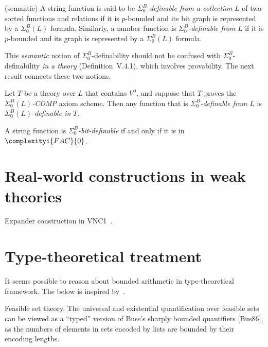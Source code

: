\begin{definition}[V.4.12] (semantic)
A string function is said to be \(\Sigma^B_0\)\textit{-definable from a collection} \(L\) of two-sorted functions and relations if it is \(p\)-bounded and its bit graph is represented by a \(\Sigma^B_0(L)\) formula.  
Similarly, a number function is \(\Sigma^B_0\)\textit{-definable from} \(L\) if it is \(p\)-bounded and its graph is represented by a \(\Sigma^B_0(L)\) formula.

\medskip
This \emph{semantic} notion of \(\Sigma^B_0\)-definability should not be confused with \(\Sigma^B_0\)-definability \emph{in a theory} (Definition~V.4.1), which involves provability.  
The next result connects these two notions.
\end{definition}

\begin{corollary}[V.4.13]
Let \(T\) be a theory over \(L\) that contains \(V^0\), and suppose that \(T\) proves the 
\(\Sigma^B_0(L)\)\textit{-COMP} axiom scheme.  
Then any function that is \(\Sigma^B_0\)\textit{-definable from} \(L\) is 
\(\Sigma^B_0(L)\)\textit{-definable in} \(T\).
\end{corollary}


\begin{proposition}[V.4.7]
A string function is \(\Sigma^B_0\)\textit{-bit-definable} if and only if it is in \(\complexityi{FAC}{0}\).
\end{proposition}

\begin{corollary}[V.2.4]
\leavevmode
\end{corollary} 



\section{Real-world constructions in weak theories}
Expander construction in VNC1~\cite{BUSS2020102796}.

\section{Type-theoretical treatment}
It seems possible to reason about bounded arithmetic in type-theoretical framework.
The below is inspired by~\cite{Li2025FeasibleMathematics}.

Feasible set theory. The universal and existential quantification over feasible sets
can be viewed as a “typed” version of Buss’s sharply bounded quantifiers [Bus86],
as the numbers of elements in sets encoded by lists are bounded by their encoding
lengths.


